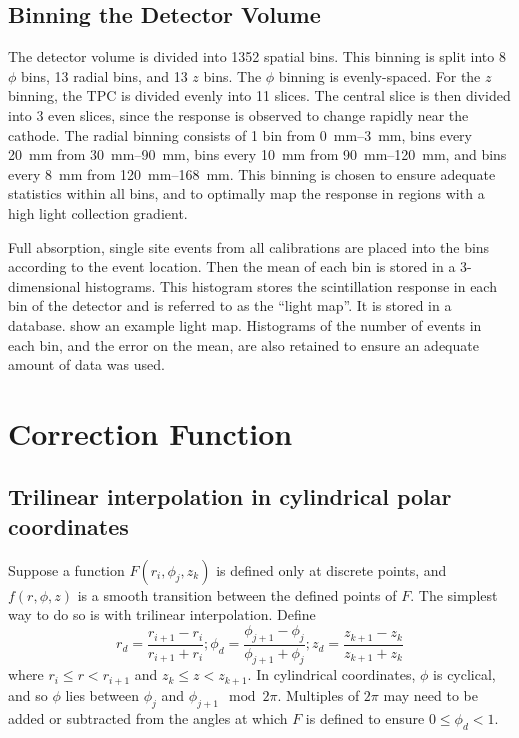 \documentclass[herrin-thesis.tex]{subfiles}
\begin{document}
\subsection{Binning the Detector Volume}

The detector volume is divided into 1352 spatial bins. This binning is split into 8 \(\phi\) bins, 13 radial bins, and 13 \(z\) bins. The \(\phi\) binning is evenly-spaced. For the \(z\) binning, the TPC is divided evenly into 11 slices. The central slice is then divided into 3 even slices, since the response is observed to change rapidly near the cathode. The radial binning consists of 1 bin from \SIrange{0}{3}{\mm}, bins every \SI{20}{mm} from \SIrange{30}{90}{\mm}, bins every \SI{10}{\mm} from \SIrange{90}{120}{\mm}, and bins every \SI{8}{mm} from \SIrange{120}{168}{\mm}. This binning is chosen to ensure adequate statistics within all bins, and to optimally map the response in regions with a high light collection gradient.

Full absorption, single site events from all calibrations are placed into the bins according to the event location. Then the mean of each bin is stored in a 3-dimensional histograms. This histogram stores the scintillation response in each bin of the detector and is referred to as the ``light map''. It is stored in a database.  show an example light map. Histograms of the number of events in each bin, and the error on the mean, are also retained to ensure an adequate amount of data was used.

\section{Correction Function}

\subsection{Trilinear interpolation in cylindrical polar coordinates}
Suppose a function \(F(r_i, \phi_j, z_k)\) is defined only at discrete points, and \(f(r, \phi, z)\) is a smooth transition between the defined points of \(F\). The simplest way to do so is with trilinear interpolation. Define
\begin{equation}
r_d = \frac{r_{i+1} - r_{i}}{r_{i+1}+r_{i}} ; \phi_d = \frac{\phi_{j+1} - \phi_{j}}{\phi_{j+1}+\phi_{j}}; z_d = \frac{z_{k+1} - z_{k}}{z_{k+1}+z_{k}}
\label{eq:lightmap_interpolation_weights}
\end{equation}
where \(r_i \leq r < r_{i+1}\) and \(z_k \leq z < z_{k+1}\). In cylindrical coordinates, \(\phi\) is cyclical, and so \(\phi\) lies between \(\phi_j\) and \(\phi_{j+1} \mod 2\pi\). Multiples of \(2\pi\) may need to be added or subtracted from the angles at which \(F\) is defined to ensure \(0 \leq \phi_d < 1\).
\end{document}

